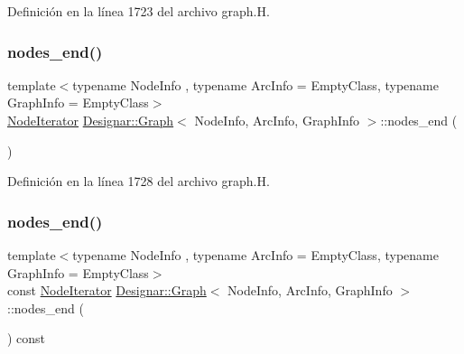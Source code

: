 Definición en la línea 1723 del archivo graph.\+H.

\mbox{\label{class_designar_1_1_graph_a9f51b69f8827aabfe5b23f82e9bc5a4d}} 
\subsubsection{\texorpdfstring{nodes\+\_\+end()}{nodes\_end()}\hspace{0.1cm}{\footnotesize\ttfamily [1/2]}}
{\footnotesize\ttfamily template$<$typename Node\+Info , typename Arc\+Info  = Empty\+Class, typename Graph\+Info  = Empty\+Class$>$ \\
\hyperlink{class_designar_1_1_graph_1_1_node_iterator}{Node\+Iterator} \hyperlink{class_designar_1_1_graph}{Designar\+::\+Graph}$<$ Node\+Info, Arc\+Info, Graph\+Info $>$\+::nodes\+\_\+end (\begin{DoxyParamCaption}{ }\end{DoxyParamCaption})\hspace{0.3cm}{\ttfamily [inline]}}



Definición en la línea 1728 del archivo graph.\+H.

\mbox{\label{class_designar_1_1_graph_abb7e32a8a05850e788f4017677965b49}} 
\subsubsection{\texorpdfstring{nodes\+\_\+end()}{nodes\_end()}\hspace{0.1cm}{\footnotesize\ttfamily [2/2]}}
{\footnotesize\ttfamily template$<$typename Node\+Info , typename Arc\+Info  = Empty\+Class, typename Graph\+Info  = Empty\+Class$>$ \\
const \hyperlink{class_designar_1_1_graph_1_1_node_iterator}{Node\+Iterator} \hyperlink{class_designar_1_1_graph}{Designar\+::\+Graph}$<$ Node\+Info, Arc\+Info, Graph\+Info $>$\+::nodes\+\_\+end (\begin{DoxyParamCaption}{ }\end{DoxyParamCaption}) const\hspace{0.3cm}{\ttfamily [inline]}}



